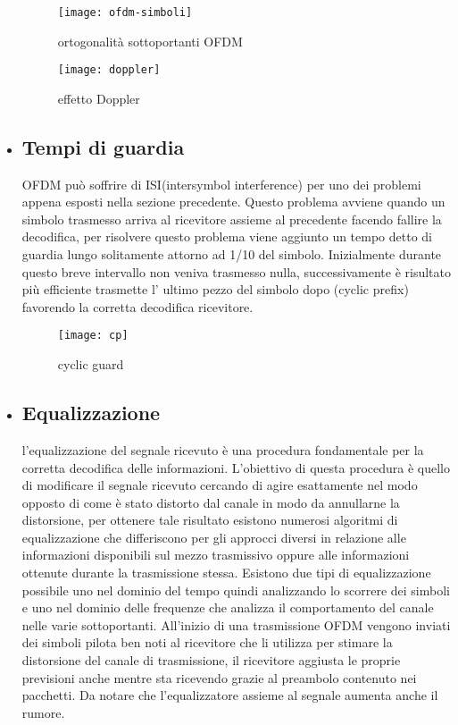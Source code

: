 \begin{itemize}
	 \begin{figure}[h]
	 	\centering
		\begin{minipage}[b]{.5\columnwidth}
	 		\texttt{[image: ofdm-simboli]}
	 		\caption{ortogonalità sottoportanti OFDM \cite{ofdm-simboli}}\label{fig:1}
 		\end{minipage}\hfill
 		\begin{minipage}[b]{.5\columnwidth}
 			\texttt{[image: doppler]}
 			\caption{effetto Doppler \cite{doppler}}\label{fig:1}
 		\end{minipage}\hfill
 	\end{figure}
 	 \item \subsection{Tempi di guardia } OFDM può soffrire di ISI(intersymbol interference) per uno dei problemi appena esposti nella sezione precedente. Questo problema avviene quando un simbolo trasmesso arriva al ricevitore assieme al precedente facendo fallire la decodifica, per risolvere questo problema viene aggiunto un tempo detto di guardia lungo solitamente attorno ad 1/10 del simbolo. Inizialmente durante questo breve intervallo non veniva trasmesso nulla, successivamente è risultato più efficiente trasmette l' ultimo pezzo del simbolo dopo (cyclic prefix) favorendo la corretta decodifica  ricevitore.
 	 \begin{figure}[h]
 	 	\centering
 	 	\texttt{[image: cp]}
 	 	\caption{cyclic guard \cite{cp}}\label{fig:1}
 	 \end{figure}
     \item \subsection{Equalizzazione} l'equalizzazione del segnale ricevuto è una procedura fondamentale per la corretta decodifica delle informazioni. L'obiettivo di questa procedura è quello di modificare il segnale ricevuto cercando di agire esattamente nel modo opposto di come è stato distorto dal canale in modo da annullarne la distorsione, per ottenere tale risultato esistono numerosi algoritmi di equalizzazione che differiscono per gli approcci diversi in relazione alle informazioni disponibili sul mezzo trasmissivo oppure alle informazioni ottenute durante la trasmissione stessa. Esistono due tipi di equalizzazione possibile uno nel dominio del tempo quindi analizzando lo scorrere dei simboli e uno nel dominio delle frequenze che analizza il comportamento del canale nelle varie sottoportanti. All'inizio di una trasmissione OFDM vengono inviati dei simboli pilota ben noti al ricevitore che li utilizza per stimare la distorsione del canale di trasmissione, il ricevitore aggiusta le proprie previsioni anche mentre sta ricevendo grazie al preambolo contenuto nei pacchetti. Da notare che l'equalizzatore assieme al segnale aumenta anche il rumore.

\end{itemize}
